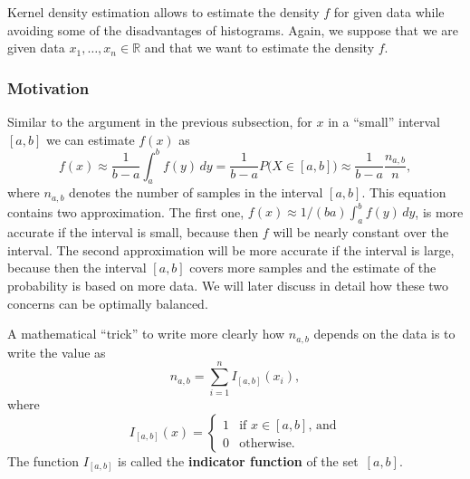 \documentclass[
  a4paper,
]{article}
\theoremstyle{definition}
\theoremstyle{definition}
\theoremstyle{definition}
\theoremstyle{definition}
\theoremstyle{remark}
\begin{document}
Kernel density estimation allows to estimate the density \(f\) for given
data while avoiding some of the disadvantages of histograms.
Again, we suppose that we are given data \(x_1, \ldots, x_n \in \mathbb{R}\)
and that we want to estimate the density \(f\).

\subsubsection{Motivation}\label{motivation}

Similar to the argument in the previous subsection, for \(x\) in a ``small''
interval \([a,b]\) we can estimate \(f(x)\) as
\begin{equation*}
  f(x)
  \approx \frac{1}{b-a} \int_a^b f(y) \,dy
  = \frac{1}{b-a} P\bigl( X\in [a,b] \bigr)
  \approx \frac{1}{b-a} \frac{n_{a,b}}{n},
\end{equation*}
where \(n_{a,b}\) denotes the number of samples in the interval \([a, b]\).
This equation contains two approximation. The first one,
\(f(x) \approx 1/(ba) \int_a^b f(y) \,dy\), is more accurate if the
interval is small, because then \(f\) will be nearly constant over the
interval. The second approximation will be more accurate if the
interval is large, because then the interval \([a,b]\) covers more samples
and the estimate of the probability is based on more data. We will later
discuss in detail how these two concerns can be optimally balanced.

A mathematical ``trick'' to write more clearly how \(n_{a,b}\) depends on the
data is to write the value as
\begin{equation*}
  n_{a,b}
  = \sum_{i=1}^n I_{[a,b]}(x_i),
\end{equation*}
where
\begin{equation*}
  I_{[a,b]}(x)
  = \begin{cases}
    1 & \mbox{if $x \in [a,b]$, and} \\
    0 & \mbox{otherwise.}
  \end{cases}
\end{equation*}
The function \(I_{[a,b]}\) is called the \textbf{indicator function} of the
set~\([a, b]\).
\end{document}
